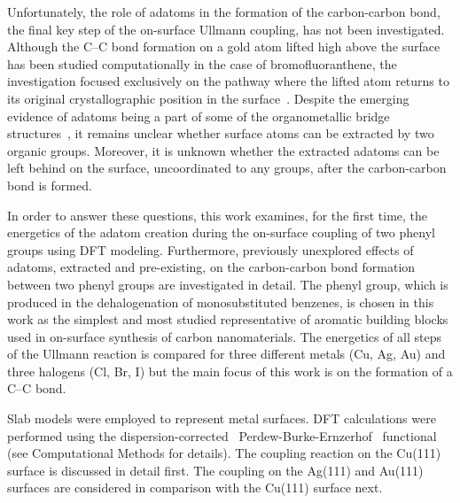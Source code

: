 \documentclass[aps,prb,amsmath,amssymb,11pt]{revtex4-1}
\newcommand*{\ACSNANO}{}
\newcommand{\zhzh}{\color{black}}
\renewcommand{\sout}[1]{\unskip}
\begin{document}
Unfortunately, the role of adatoms in the formation of the carbon-carbon bond, the final key step of the on-surface Ullmann coupling, has not been investigated. Although the C--C bond formation on a gold atom lifted high above the surface has been studied computationally in the case of bromofluoranthene,
the investigation focused exclusively on the pathway where the lifted atom returns to its original crystallographic position in the surface~\cite{jpcc2018}. 
%
Despite the emerging evidence of adatoms being a part of some of the organometallic bridge structures~\cite{acsnano2017, acsnano2019}, it remains unclear whether surface atoms can be extracted by two organic groups. Moreover, it is unknown whether the extracted adatoms can be left behind on the surface, uncoordinated to any groups, after the carbon-carbon bond is formed. \sout{and, most importantly, whether they can participate in subsequent catalytic coupling cycles.}

In order to answer these questions, this work examines, for the first time, the energetics of the adatom creation during the on-surface coupling of two phenyl groups using DFT modeling. 
Furthermore, previously unexplored effects of adatoms, extracted and pre-existing, on the carbon-carbon bond formation between two phenyl groups are investigated in detail. 
The phenyl group, which is produced in the dehalogenation of monosubstituted benzenes, is chosen in this work as the simplest and most studied representative of aromatic building blocks used in on-surface synthesis of carbon nanomaterials. The energetics of all steps of the Ullmann reaction is compared for three different metals (Cu, Ag, Au) and three halogens (Cl, Br, I) {\zhzh but the main focus of this work is on the formation of a C--C bond.} 

\ifdefined\ACSNANO
\else

\fi



\ifdefined\ACSNANO

Slab models were employed to represent metal surfaces. DFT calculations were performed using the dispersion-corrected~\cite{ullmann_136, ullmann_137} Perdew-Burke-Ernzerhof~\cite{ullmann_139} functional (see Computational Methods for details).
%
\fi
%
The coupling reaction on the Cu(111) surface is discussed in detail first. The coupling on the Ag(111) and Au(111) surfaces are considered in comparison with the Cu(111) surface next.
\end{document}
